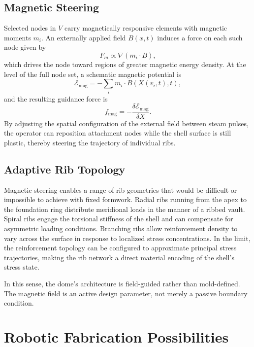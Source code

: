 \documentclass[12pt,a4paper]{article}
\begin{document}
\subsection{Magnetic Steering}

Selected nodes in $V$ carry magnetically responsive elements with
magnetic moments $m_i$. An externally applied field $B(x,t)$ induces a
force on each such node given by
\begin{equation}
F_m \propto \nabla(m_i \cdot B),
\end{equation}
which drives the node toward regions of greater magnetic energy density.
At the level of the full node set, a schematic magnetic potential is
\begin{equation}
\mathcal{E}_{\mathrm{mag}}
= -\sum_i m_i \cdot B(X(v_i,t),t),
\end{equation}
and the resulting guidance force is
\begin{equation}
f_{\mathrm{mag}} = -\frac{\delta \mathcal{E}_{\mathrm{mag}}}{\delta X}.
\end{equation}
By adjusting the spatial configuration of the external field between
steam pulses, the operator can reposition attachment nodes while the
shell surface is still plastic, thereby steering the trajectory of
individual ribs.

\subsection{Adaptive Rib Topology}

Magnetic steering enables a range of rib geometries that would be
difficult or impossible to achieve with fixed formwork. Radial ribs
running from the apex to the foundation ring distribute meridional
loads in the manner of a ribbed vault. Spiral ribs engage the torsional
stiffness of the shell and can compensate for asymmetric loading
conditions. Branching ribs allow reinforcement density to vary across
the surface in response to localized stress concentrations. In the
limit, the reinforcement topology can be configured to approximate
principal stress trajectories, making the rib network a direct material
encoding of the shell's stress state.

In this sense, the dome's architecture is field-guided rather than
mold-defined. The magnetic field is an active design parameter, not
merely a passive boundary condition.

\section{Robotic Fabrication Possibilities}
\end{document}
